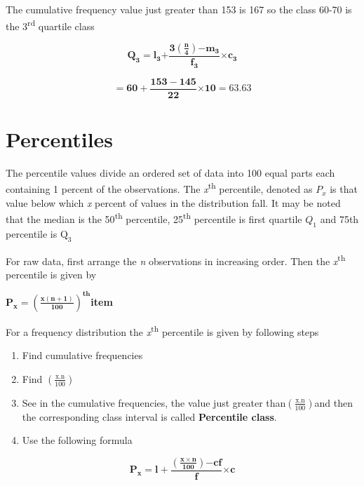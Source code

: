 \documentclass[
]{book}
\begin{document}
The cumulative frequency value just greater than 153 is 167 so the class
60-70 is the 3\textsuperscript{rd} quartile class

\[\mathbf{Q}_{\mathbf{3}}\mathbf{=}\mathbf{l}_{\mathbf{3}}\mathbf{+}\frac{\mathbf{3}\left( \frac{\mathbf{n}}{\mathbf{4}} \right)\mathbf{-}\mathbf{m}_{\mathbf{3}}}{\mathbf{f}_{\mathbf{3}}}\mathbf{\times}\mathbf{c}_{\mathbf{3}}\]

\[\mathbf{= 60 +}\frac{\mathbf{153 - 145}}{\mathbf{22}}\mathbf{\times 10 = 63.63}\]

\hypertarget{percentiles}{%
\section{Percentiles}\label{percentiles}}

The percentile values divide an ordered set of data into 100 equal parts
each containing 1 percent of the observations. The \emph{x}\textsuperscript{th} percentile,
denoted as \(P_{x}\) is that value below which \emph{x} percent of values in
the distribution fall. It may be noted that the median is the 50\textsuperscript{th}
percentile, 25\textsuperscript{th} percentile is first quartile \(Q_{1}\) and 75th
percentile is\(\text{\ Q}_{3}\ \)

For raw data, first arrange the \emph{n} observations in increasing order.
Then the \emph{x}\textsuperscript{th} percentile is given by

\(\mathbf{P}_{\mathbf{x}}\mathbf{=}\left( \frac{\mathbf{x}\left( \mathbf{n + 1} \right)}{\mathbf{100}} \right)^{\mathbf{\text{th}}}\)\textbf{item}

For a frequency distribution the \emph{x}\textsuperscript{th} percentile is given by
following steps

\begin{enumerate}
\def\labelenumi{\arabic{enumi}.}
\item
  Find cumulative frequencies
\item
  Find \(\left( \frac{\text{x.n}}{100} \right)\)
\item
  See in the cumulative frequencies, the value just greater
  than\(\left( \frac{\text{x.n}}{100} \right)\)and then the
  corresponding class interval is called \textbf{Percentile class}.
\item
  Use the following formula
\end{enumerate}

\[\mathbf{P}_{\mathbf{x}}\mathbf{= l +}\frac{\left( \frac{\mathbf{x \times n}}{\mathbf{100}} \right)\mathbf{- cf}}{\mathbf{f}}\mathbf{\times c}\]
\end{document}
